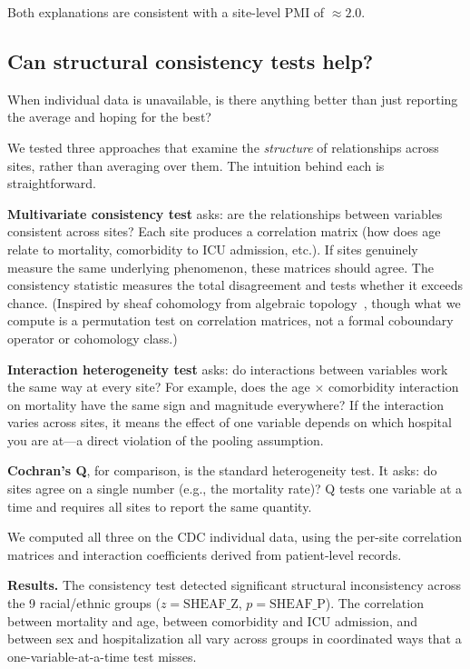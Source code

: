 \documentclass{article}
\begin{document}
Both explanations are consistent with a site-level PMI of $\approx 2.0$.


\subsection{Can structural consistency tests help?}

When individual data is unavailable, is there anything better than
just reporting the average and hoping for the best?

We tested three approaches that examine the \emph{structure} of relationships
across sites, rather than averaging over them.  The intuition behind each is
straightforward.

\textbf{Multivariate consistency test} asks: are the relationships between
variables consistent across sites?  Each site produces a correlation matrix
(how does age relate to mortality, comorbidity to ICU admission, etc.).  If
sites genuinely measure the same underlying phenomenon, these matrices should
agree.  The consistency statistic measures the total disagreement and tests
whether it exceeds chance.  (Inspired by sheaf cohomology from algebraic
topology~\cite{robinson2017sheaf}, though what we compute is a permutation
test on correlation matrices, not a formal coboundary operator or cohomology
class.)

\textbf{Interaction heterogeneity test} asks: do interactions between
variables work the same way at every site?  For example, does the
age $\times$ comorbidity interaction on mortality have the same sign and
magnitude everywhere?  If the interaction varies across sites, it means the
effect of one variable depends on which hospital you are at---a direct
violation of the pooling assumption.

\textbf{Cochran's Q}, for comparison, is the standard heterogeneity test.  It
asks: do sites agree on a single number (e.g., the mortality rate)?  Q tests
one variable at a time and requires all sites to report the same quantity.

We computed all three on the CDC individual data, using the per-site
correlation matrices and interaction coefficients derived from patient-level
records.

\textbf{Results.}  The consistency test detected significant structural
inconsistency across the 9 racial/ethnic groups ($z = \text{SHEAF\_Z}$, $p =
\text{SHEAF\_P}$).  The correlation between mortality and age, between
comorbidity and ICU admission, and between sex and hospitalization all vary
across groups in coordinated ways that a one-variable-at-a-time test misses.
\end{document}
